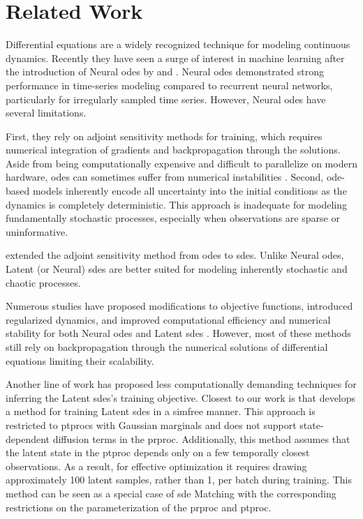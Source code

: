 \section{Related Work}
\label{sec:related_work}


Differential equations are a widely recognized technique for modeling continuous dynamics. Recently they have seen a surge of interest in machine learning after the introduction of Neural \glspl{ode} by \citet{chen2018neural} and \citet{rubanova2019latent}. Neural \glspl{ode} demonstrated strong performance in time-series modeling compared to recurrent neural networks, particularly for irregularly sampled time series. However, Neural \glspl{ode} have several limitations.


First, they rely on adjoint sensitivity methods for training, which requires numerical integration of gradients and backpropagation through the solutions. Aside from being computationally expensive and difficult to parallelize on modern hardware, \glspl{ode} can sometimes suffer from numerical instabilities \cite{lea2000sensitivity}. Second, \gls{ode}-based models inherently encode all uncertainty into the initial conditions as the dynamics is completely deterministic. This approach is inadequate for modeling fundamentally stochastic processes, especially when observations are sparse or uninformative.


\citet{li2020scalable} extended the adjoint sensitivity method from \glspl{ode} to \glspl{sde}. Unlike Neural \glspl{ode}, Latent (or Neural) \glspl{sde} are better suited for modeling inherently stochastic and chaotic processes.


Numerous studies have proposed modifications to objective functions, introduced regularized dynamics, and improved computational efficiency and numerical stability for both Neural \glspl{ode} \cite{kelly2020learning, finlay2020train, kidger2021hey} and Latent \glspl{sde} \cite{kidger2021efficient}. However, most of these methods still rely on backpropagation through the numerical solutions of differential equations limiting their scalability.


Another line of work \cite{archambeau2007gaussian, archambeau2007variational} has proposed less computationally demanding techniques for inferring the Latent \glspl{sde}'s training objective. Closest to our work is \citet{course2024amortized} that develops a method for training Latent \glspl{sde} in a \gls{simfree} manner. This approach is restricted to \glspl{ptproc} with Gaussian marginals and does not support state-dependent diffusion terms in the \gls{prproc}. Additionally, this method assumes that the latent state in the \gls{ptproc} depends only on a few temporally closest observations. As a result, for effective optimization it requires drawing approximately 100 latent samples,  rather than 1, per batch during training. This method can be seen as a special case of \gls{sde} Matching with the corresponding restrictions on the parameterization of the \gls{prproc} and \gls{ptproc}.


